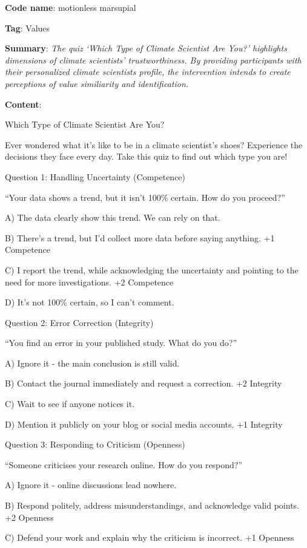 \documentclass[
  letterpaper,
  DIV=11,
  numbers=noendperiod]{scrartcl}
\begin{document}
\textbf{Code name}: motionless marsupial

\textbf{Tag}: Values

\textbf{Summary}: \emph{The quiz `Which Type of Climate Scientist Are
You?' highlights dimensions of climate scientists' trustworthiness. By
providing participants with their personalized climate scientists
profile, the intervention intends to create perceptions of value
similiarity and identification.}

\textbf{Content}:

Which Type of Climate Scientist Are You?

Ever wondered what it's like to be in a climate scientist's shoes?
Experience the decisions they face every day. Take this quiz to find out
which type you are!

Question 1: Handling Uncertainty (Competence)

``Your data shows a trend, but it isn't 100\% certain. How do you
proceed?''

A) The data clearly show this trend. We can rely on that.

B) There's a trend, but I'd collect more data before saying anything. +1
Competence

C) I report the trend, while acknowledging the uncertainty and pointing
to the need for more investigations. +2 Competence

D) It's not 100\% certain, so I can't comment.

Question 2: Error Correction (Integrity)

``You find an error in your published study. What do you do?''

A) Ignore it - the main conclusion is still valid.

B) Contact the journal immediately and request a correction. +2
Integrity

C) Wait to see if anyone notices it.

D) Mention it publicly on your blog or social media accounts. +1
Integrity

Question 3: Responding to Criticism (Openness)

``Someone criticises your research online. How do you respond?''

A) Ignore it - online discussions lead nowhere.

B) Respond politely, address misunderstandings, and acknowledge valid
points. +2 Openness

C) Defend your work and explain why the criticism is incorrect. +1
Openness
\end{document}
